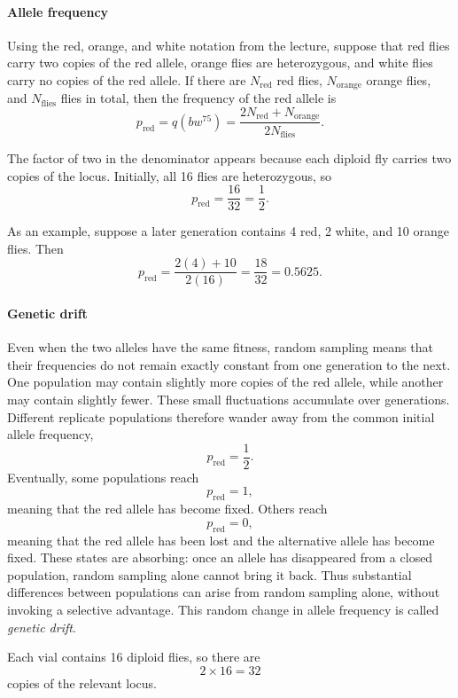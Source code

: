 \paragraph{Allele frequency}
Using the red, orange, and white notation from the lecture, suppose that red flies carry two copies of the red allele, orange flies are heterozygous, and white flies carry no copies of the red allele.
If there are $N_{\mathrm{red}}$ red flies, $N_{\mathrm{orange}}$ orange flies, and $N_{\mathrm{flies}}$ flies in total, then the frequency of the red allele is
\[
    p_{\mathrm{red}} = q(bw^{75}) = \frac{2N_{\mathrm{red}}+N_{\mathrm{orange}}}{2N_{\mathrm{flies}}}.
\]

The factor of two in the denominator appears because each diploid fly carries two copies of the locus.
Initially, all 16 flies are heterozygous, so
\[
    p_{\mathrm{red}} = \frac{16}{32} = \frac{1}{2}.
\]

As an example, suppose a later generation contains 4 red, 2 white, and 10 orange flies.
Then
\[
    p_{\mathrm{red}} = \frac{2(4)+10}{2(16)} = \frac{18}{32} = 0.5625.
\]
% 
\paragraph{Genetic drift}
Even when the two alleles have the same fitness, random sampling means that their frequencies do not remain exactly constant from one generation to the next.
One population may contain slightly more copies of the red allele, while another may contain slightly fewer.
These small fluctuations accumulate over generations.
Different replicate populations therefore wander away from the common initial allele frequency,
\[
    p_{\mathrm{red}}=\frac{1}{2}.
\]
Eventually, some populations reach
\[
    p_{\mathrm{red}}=1,
\]
meaning that the red allele has become fixed.
Others reach
\[
    p_{\mathrm{red}}=0,
\]
meaning that the red allele has been lost and the alternative allele has become fixed.
These states are absorbing: once an allele has disappeared from a closed population, random sampling alone cannot bring it back.
Thus substantial differences between populations can arise from random sampling alone, without invoking a selective advantage.
This random change in allele frequency is called \emph{genetic drift}.


\label{sec:buri-vector}
Each vial contains 16 diploid flies, so there are
\[
    2\times16=32
\]
copies of the relevant locus.

